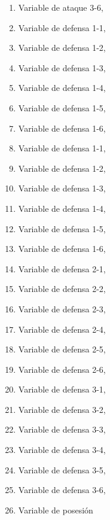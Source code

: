 \begin{multicols}{2}
\begin{enumerate}
		\item Variable de ataque 3-6, 
		\item Variable de defensa 1-1, 
		\item Variable de defensa 1-2, 
		\item Variable de defensa 1-3, 
		\item Variable de defensa 1-4, 
		\item Variable de defensa 1-5, 
		\item Variable de defensa 1-6, 
		\item Variable de defensa 1-1,
		\item Variable de defensa 1-2, 
		\item Variable de defensa 1-3, 
		\item Variable de defensa 1-4, 
		\item Variable de defensa 1-5, 
		\item Variable de defensa 1-6, 
		\item Variable de defensa 2-1, 
		\item Variable de defensa 2-2, 
		\item Variable de defensa 2-3, 
		\item Variable de defensa 2-4, 
		\item Variable de defensa 2-5, 
		\item Variable de defensa 2-6, 
		\item Variable de defensa 3-1, 
		\item Variable de defensa 3-2, 
		\item Variable de defensa 3-3, 
		\item Variable de defensa 3-4, 
		\item Variable de defensa 3-5, 
		\item Variable de defensa 3-6, 
		\item Variable de posesión
	\end{enumerate}
\end{multicols}
